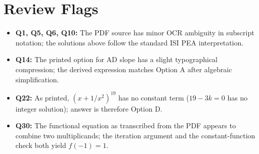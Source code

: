 \documentclass[11pt]{article}
\begin{document}
\medskip

\section*{Review Flags}
\begin{itemize}[leftmargin=*]
\item \textbf{Q1, Q5, Q6, Q10:} The PDF source has minor OCR ambiguity in subscript notation; the solutions above follow the standard ISI PEA interpretation.
\item \textbf{Q14:} The printed option for AD slope has a slight typographical compression; the derived expression matches Option A after algebraic simplification.
\item \textbf{Q22:} As printed, $(x+1/x^2)^{19}$ has no constant term ($19-3k=0$ has no integer solution); answer is therefore Option D.
\item \textbf{Q30:} The functional equation as transcribed from the PDF appears to combine two multiplicands; the iteration argument and the constant-function check both yield $f(-1)=1$.
\end{itemize}
\end{document}
